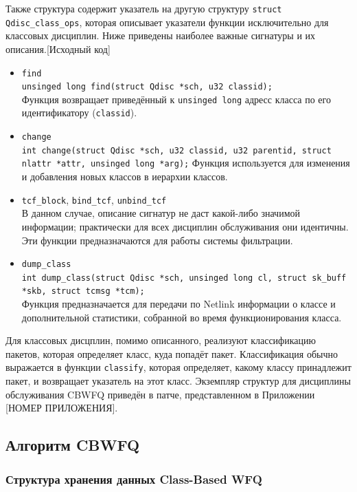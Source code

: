 	Также структура содержит указатель на другую структуру \lstinline{struct Qdisc_class_ops},
	которая описывает указатели функции исключительно для классовых дисциплин.
	Ниже приведены наиболее важные сигнатуры и их описания.[Исходный код]
	\begin{itemize}
		\item \lstinline{find}\\
			\lstinline{unsinged long find(struct Qdisc *sch, u32 classid);}\\
			Функция возвращает приведённый к \lstinline{unsinged long} адресс класса по его идентификатору (\lstinline{classid}).
		\item \lstinline{change} \\
			\lstinline{int change(struct Qdisc *sch, u32 classid, u32 parentid, struct nlattr *attr, unsinged long *arg);}
			Функция используется для изменения и добавления новых классов в иерархии классов. 
		\item \lstinline{tcf_block}, \lstinline{bind_tcf}, \lstinline{unbind_tcf}\\
			В данном случае, описание сигнатур не даст какой-либо значимой информации; практически
			для всех дисциплин обслуживания они идентичны. Эти функции предназначаются для работы
			системы фильтрации.
		\item \lstinline{dump_class}\\
			\lstinline{int dump_class(struct Qdisc *sch, unsinged long cl, struct sk_buff *skb, struct tcmsg *tcm);} \\
			Функция предназначается для передачи по Netlink информации о классе и дополнительной статистики, собранной
			во время функционирования класса.
	\end{itemize}

	Для классовых дисцплин, помимо описанного, реализуют классификацию пакетов, которая
	определяет класс, куда попадёт пакет. Классификация обычно выражается в функции \lstinline{classify},
	которая определяет, какому классу принадлежит пакет, и возвращает указатель на этот класс.
	Экземпляр структур для дисциплины обслуживания CBWFQ приведён в патче, представленном в Приложении
	[НОМЕР ПРИЛОЖЕНИЯ].

	\subsection{Алгоритм CBWFQ}

	
		\subsubsection{Структура хранения данных Class-Based WFQ}

